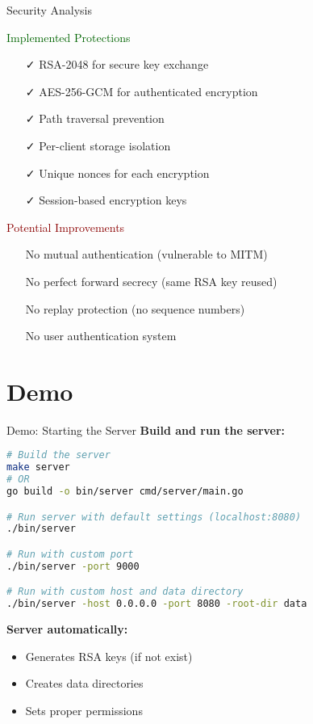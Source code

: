 \documentclass[aspectratio=169]{beamer}
\begin{document}
\begin{frame}{Security Analysis}
\begin{block}{\textcolor{darkgreen}{Implemented Protections}}
\begin{itemize}
    \item[\faCheck] RSA-2048 for secure key exchange
    \item[\faCheck] AES-256-GCM for authenticated encryption
    \item[\faCheck] Path traversal prevention
    \item[\faCheck] Per-client storage isolation
    \item[\faCheck] Unique nonces for each encryption
    \item[\faCheck] Session-based encryption keys
\end{itemize}
\end{block}

\vspace{0.3cm}

\begin{alertblock}{\textcolor{darkred}{Potential Improvements}}
\begin{itemize}
    \item[\faTimes] No mutual authentication (vulnerable to MITM)
    \item[\faTimes] No perfect forward secrecy (same RSA key reused)
    \item[\faTimes] No replay protection (no sequence numbers)
    \item[\faTimes] No user authentication system
\end{itemize}
\end{alertblock}
\end{frame}

\section{Demo}

\begin{frame}[fragile]{Demo: Starting the Server}
\textbf{Build and run the server:}
\begin{lstlisting}[language=bash, basicstyle=\ttfamily\footnotesize]
# Build the server
make server
# OR
go build -o bin/server cmd/server/main.go

# Run server with default settings (localhost:8080)
./bin/server

# Run with custom port
./bin/server -port 9000

# Run with custom host and data directory
./bin/server -host 0.0.0.0 -port 8080 -root-dir data
\end{lstlisting}

\vspace{0.3cm}

\textbf{Server automatically:}
\begin{itemize}
    \item Generates RSA keys (if not exist)
    \item Creates data directories
    \item Sets proper permissions
\end{itemize}
\end{frame}
\end{document}
